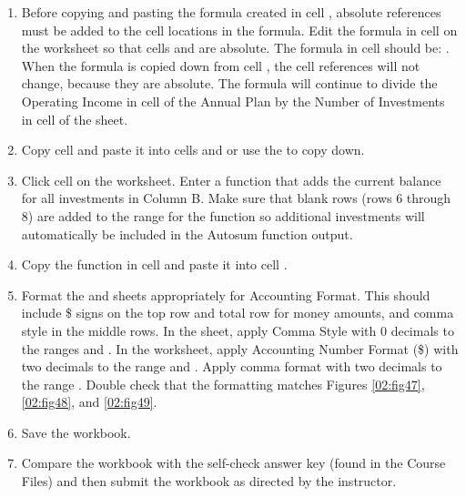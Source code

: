 \begin{enumerate}
	\item Before copying and pasting the formula created in cell , absolute references must be added to the cell locations in the formula. Edit the formula in cell  on the  worksheet so that cells  and  are absolute. The formula in cell  should be: . When the formula is copied down from cell , the cell references will not change, because they are absolute. The formula will continue to divide the Operating Income in cell  of the Annual Plan by the Number of Investments in cell  of the  sheet.
	
	\item Copy cell  and paste it into cells  and  or use the  to copy down.
	
	\item Click cell  on the  worksheet. Enter a  function that adds the current balance for all investments in Column B. Make sure that blank rows (rows 6 through 8) are added to the range for the function so additional investments will automatically be included in the Autosum function output.
	
	\item Copy the  function in cell  and paste it into cell .
	
	\item Format the  and  sheets appropriately for Accounting Format. This should include \$ signs on the top row and total row for money amounts, and comma style in the middle rows. In the  sheet, apply Comma Style with $ 0 $ decimals to the ranges  and . In the  worksheet, apply Accounting Number Format (\$) with two decimals to the range  and . Apply comma format with two decimals to the range . Double check that the formatting matches Figures \ref{02:fig47}, \ref{02:fig48}, and \ref{02:fig49}.
	
	\item Save the  workbook.
	
	\item Compare the workbook with the self-check answer key (found in the Course Files) and then submit the  workbook as directed by the instructor.
\end{enumerate}

